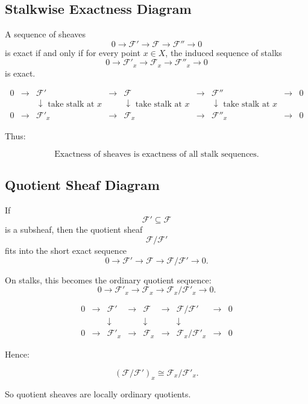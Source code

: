 \documentclass[12pt,a4paper]{article}
\newcommand{\F}{\mathcal F}
\theoremstyle{notespace}
\newcommand{\Fp}{\mathcal F'}      %
\newcommand{\Fpp}{\mathcal F''}
\begin{document}
\subsection{Stalkwise Exactness Diagram}

A sequence of sheaves
\[
0\to \Fp\to \F\to \Fpp\to 0
\]
is exact if and only if for every point \(x\in X\), the induced sequence of stalks
\[
0\to \Fp_x\to \F_x\to \Fpp_x\to 0
\]
is exact.

\[
\begin{array}{ccccccccc}
	0 & \longrightarrow & \Fp & \longrightarrow & \F & \longrightarrow & \Fpp & \longrightarrow & 0 \\
	&                 & \downarrow\text{ take stalk at }x
	&                 & \downarrow\text{ take stalk at }x
	&                 & \downarrow\text{ take stalk at }x
	&                 &   \\
	0 & \longrightarrow & \Fp_x & \longrightarrow & \F_x & \longrightarrow & \Fpp_x & \longrightarrow & 0
\end{array}
\]

Thus:

\[
\boxed{
	\text{Exactness of sheaves is exactness of all stalk sequences.}
}
\]

\subsection{Quotient Sheaf Diagram}

If
\[
\Fp\subseteq \F
\]
is a subsheaf, then the quotient sheaf
\[
\F/\Fp
\]
fits into the short exact sequence
\[
0\to \Fp\to \F\to \F/\Fp\to 0.
\]

On stalks, this becomes the ordinary quotient sequence:
\[
0\to \Fp_x\to \F_x\to \F_x/\Fp_x\to 0.
\]

\[
\begin{array}{ccccccccc}
	0 & \longrightarrow & \Fp & \longrightarrow & \F & \longrightarrow & \F/\Fp & \longrightarrow & 0 \\
	&                 & \downarrow
	&                 & \downarrow
	&                 & \downarrow
	&                 &   \\
	0 & \longrightarrow & \Fp_x & \longrightarrow & \F_x & \longrightarrow & \F_x/\Fp_x & \longrightarrow & 0
\end{array}
\]

Hence:

\[
\boxed{
	(\F/\Fp)_x\cong \F_x/\Fp_x.
}
\]

So quotient sheaves are locally ordinary quotients.
\end{document}
